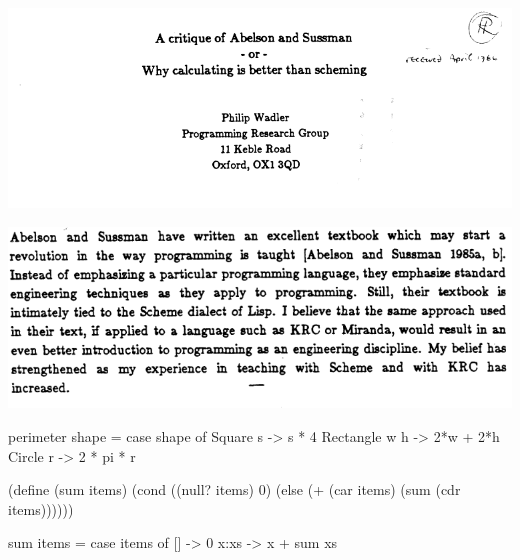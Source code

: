 \documentclass[UKenglish,usenames,dvipsnames,svgnames,table,aspectratio=169,mathserif]{beamer}
\newcommand{\nl}{\vspace{\baselineskip}}
\newcommand{\pnl}{\pause \nl}
\begin{document}









\begin{frame}
\centering
\includegraphics[scale=0.5]{wadler-title.png}
\end{frame}


\begin{frame}
\centering
\includegraphics[scale=0.55]{wadler-abstract.png}
\end{frame}

\begin{frame}[fragile]
\begin{haskellcode}
perimeter shape = case shape of
  Square s      -> s * 4
  Rectangle w h -> 2*w + 2*h
  Circle r      -> 2 * pi * r
\end{haskellcode}
\end{frame}


\begin{frame}[fragile]
\begin{schemecode}
(define (sum items)
  (cond ((null? items) 0)
        (else (+ (car items) (sum (cdr items))))))
\end{schemecode}

\pnl

\begin{haskellcode}
sum items = case items of
  []   -> 0
  x:xs -> x + sum xs
\end{haskellcode}
\end{frame}
\end{document}
